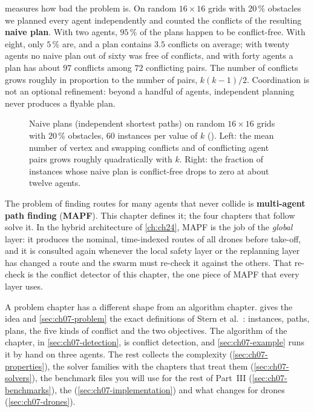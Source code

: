  measures how bad the problem is. On random
$16 \times 16$ grids with $20\,\%$ obstacles we planned every agent
independently and counted the conflicts of the resulting \textbf{naive
plan}. With two agents, $95\,\%$ of the plans happen to be
conflict-free. With eight, only $5\,\%$ are, and a plan contains $3.5$
conflicts on average; with twenty agents no naive plan out of sixty was free
of conflicts, and with forty agents a plan has about $97$ conflicts among
$72$ conflicting pairs. The number of conflicts grows roughly in
proportion to the number of pairs, $k(k-1)/2$. Coordination is not an optional refinement: beyond a
handful of agents, independent planning never produces a flyable plan.

\begin{figure}[!htb]
  \centering
  \caption{Naive plans (independent shortest paths) on random $16 \times 16$
  grids with $20\,\%$ obstacles, $60$ instances per value of $k$
  (). Left: the mean number of vertex and
  swapping conflicts and of conflicting agent pairs grows roughly
  quadratically with $k$. Right: the fraction of instances whose naive plan is
  conflict-free drops to zero at about twelve agents.}
  \label{fig:ch07-conflict-growth}
\end{figure}

The problem of finding routes for many agents that never collide is
\textbf{multi-agent path finding}
(\textbf{MAPF}). This chapter defines it; the four chapters that follow solve
it. In the hybrid architecture of \cref{ch:ch24}, MAPF is the job of the
\emph{global} layer: it produces the nominal, time-indexed routes of all
drones before take-off, and it is consulted again whenever the local
safety layer or the replanning layer has changed a route and the swarm
must re-check it against the others. That re-check is the conflict detector
of this chapter, the one piece of MAPF that every layer uses.

A problem chapter has a different shape from an algorithm chapter.
 gives the idea and \cref{sec:ch07-problem} the exact
definitions of Stern et al.~\cite{stern2019mapf}: instances, paths, plans, the
five kinds of conflict and the two objectives. The algorithm of the chapter,
in \cref{sec:ch07-detection}, is conflict detection, and
\cref{sec:ch07-example} runs it by hand on three agents. The rest collects the
complexity (\cref{sec:ch07-properties}), the solver families with the chapters
that treat them (\cref{sec:ch07-solvers}), the benchmark files you will use
for the rest of Part~III (\cref{sec:ch07-benchmarks}), the \python
(\cref{sec:ch07-implementation}) and what changes for drones
(\cref{sec:ch07-drones}).

